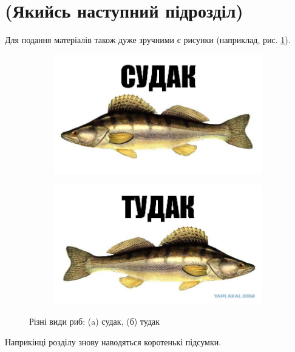 \section{(Якийсь наступний підрозділ)}

Для подання матеріалів також дуже зручними є рисунки (наприклад, рис.
\ref{fig_sudak}).


\begin{figure}[ht]
\centering
    \begin{subfigure}[b]{0.5\textwidth}    
        \includegraphics[scale=0.3]{Images/Sudak.png}
        \caption{}
    \end{subfigure}%
    \begin{subfigure}[b]{0.5\textwidth}
        \includegraphics[scale=0.3]{Images/Tudak.png}
        \caption{}
    \end{subfigure}
 
    \caption{Різні види риб: (a) судак, (б) тудак}
    \label{fig_sudak}
\end{figure}

\chapconclude

Наприкінці розділу знову наводяться коротенькі підсумки.